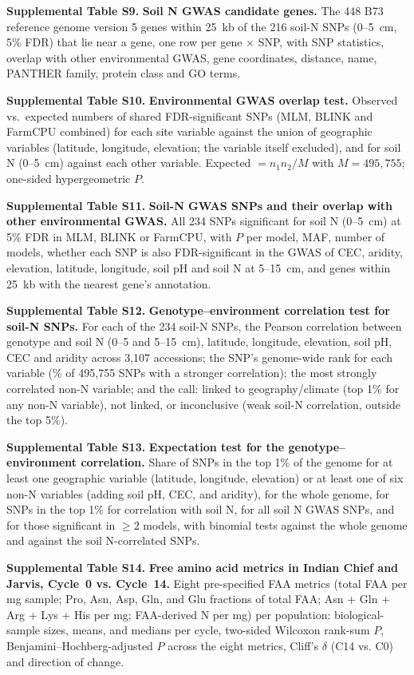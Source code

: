 \documentclass[11pt]{article}
\begin{document}
\noindent\textbf{Supplemental Table S9.} \textbf{Soil N GWAS candidate genes.} The 448 B73 reference genome version 5 genes within 25~kb of the 216 soil-N SNPs (0--5~cm, 5\% FDR) that lie near a gene, one row per gene $\times$ SNP, with SNP statistics, overlap with other environmental GWAS, gene coordinates, distance, name, PANTHER family, protein class and GO terms.

\noindent\textbf{Supplemental Table S10.} \textbf{Environmental GWAS overlap test.} Observed vs.\ expected numbers of shared FDR-significant SNPs (MLM, BLINK and FarmCPU combined) for each site variable against the union of geographic variables (latitude, longitude, elevation; the variable itself excluded), and for soil N (0--5~cm) against each other variable. Expected $= n_1 n_2 / M$ with $M = 495{,}755$; one-sided hypergeometric $P$.

\noindent\textbf{Supplemental Table S11.} \textbf{Soil-N GWAS SNPs and their overlap with other environmental GWAS.} All 234 SNPs significant for soil N (0--5~cm) at 5\% FDR in MLM, BLINK or FarmCPU, with $P$ per model, MAF, number of models, whether each SNP is also FDR-significant in the GWAS of CEC, aridity, elevation, latitude, longitude, soil pH and soil N at 5--15~cm, and genes within 25~kb with the nearest gene's annotation.

\noindent\textbf{Supplemental Table S12.} \textbf{Genotype--environment correlation test for soil-N SNPs.} For each of the 234 soil-N SNPs, the Pearson correlation between genotype and soil N (0--5 and 5--15~cm), latitude, longitude, elevation, soil pH, CEC and aridity across 3,107 accessions; the SNP's genome-wide rank for each variable (\% of 495,755 SNPs with a stronger correlation); the most strongly correlated non-N variable; and the call: linked to geography/climate (top 1\% for any non-N variable), not linked, or inconclusive (weak soil-N correlation, outside the top 5\%).

\noindent\textbf{Supplemental Table S13.} \textbf{Expectation test for the genotype–environment correlation.} Share of SNPs in the top 1\% of the genome for at least one geographic variable (latitude, longitude, elevation) or at least one of six non-N variables (adding soil pH, CEC, and aridity), for the whole genome, for SNPs in the top 1\% for correlation with soil N, for all soil N GWAS SNPs, and for those significant in $\geq$2 models, with binomial tests against the whole genome and against the soil N-correlated SNPs.

\noindent\textbf{Supplemental Table S14.} \textbf{Free amino acid metrics in Indian Chief and Jarvis, Cycle~0 vs. Cycle~14.} Eight pre-specified FAA metrics (total FAA per mg sample; Pro, Asn, Asp, Gln, and Glu fractions of total FAA; Asn + Gln + Arg + Lys + His per mg; FAA-derived N per mg) per population: biological-sample sizes, means, and medians per cycle, two-sided Wilcoxon rank-sum $P$, Benjamini--Hochberg-adjusted $P$ across the eight metrics, Cliff's $\delta$ (C14 vs. C0) and direction of change.
\end{document}
